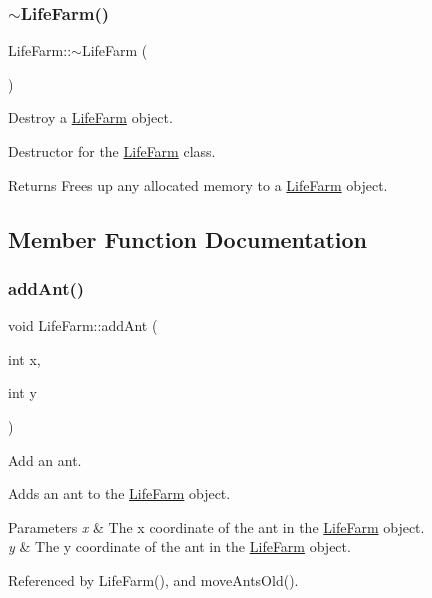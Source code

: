 \subsubsection{\texorpdfstring{$\sim$\+Life\+Farm()}{~LifeFarm()}}
{\footnotesize\ttfamily Life\+Farm\+::$\sim$\+Life\+Farm (\begin{DoxyParamCaption}{ }\end{DoxyParamCaption})}



Destroy a \hyperlink{class_life_farm}{Life\+Farm} object. 

Destructor for the \hyperlink{class_life_farm}{Life\+Farm} class. \begin{DoxyReturn}{Returns}
Frees up any allocated memory to a \hyperlink{class_life_farm}{Life\+Farm} object. 
\end{DoxyReturn}


\subsection{Member Function Documentation}
\mbox{\label{class_life_farm_ac7ca1a0ae94a971bd04a699f99965b00}} 
\subsubsection{\texorpdfstring{add\+Ant()}{addAnt()}}
{\footnotesize\ttfamily void Life\+Farm\+::add\+Ant (\begin{DoxyParamCaption}\item[{int}]{x,  }\item[{int}]{y }\end{DoxyParamCaption})}



Add an ant. 

Adds an ant to the \hyperlink{class_life_farm}{Life\+Farm} object. 
\begin{DoxyParams}{Parameters}
{\em x} & The x coordinate of the ant in the \hyperlink{class_life_farm}{Life\+Farm} object. \\
\hline
{\em y} & The y coordinate of the ant in the \hyperlink{class_life_farm}{Life\+Farm} object. \\
\hline
\end{DoxyParams}


Referenced by Life\+Farm(), and move\+Ants\+Old().

